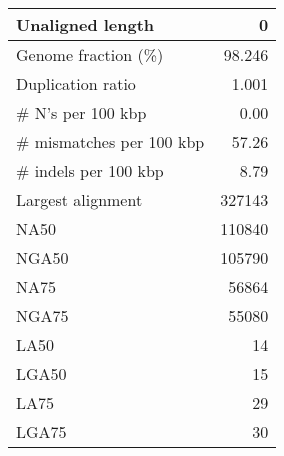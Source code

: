 \documentclass[12pt,a4paper]{article}
\begin{document}
\begin{table}[ht]
\begin{center}
\begin{tabular}{|l*{1}{|r}|}
Unaligned length & 0 \\ \hline
Genome fraction (\%) & 98.246 \\ \hline
Duplication ratio & 1.001 \\ \hline
\# N's per 100 kbp & 0.00 \\ \hline
\# mismatches per 100 kbp & 57.26 \\ \hline
\# indels per 100 kbp & 8.79 \\ \hline
Largest alignment & 327143 \\ \hline
NA50 & 110840 \\ \hline
NGA50 & 105790 \\ \hline
NA75 & 56864 \\ \hline
NGA75 & 55080 \\ \hline
LA50 & 14 \\ \hline
LGA50 & 15 \\ \hline
LA75 & 29 \\ \hline
LGA75 & 30 \\ \hline
\end{tabular}
\end{center}
\end{table}
\end{document}
